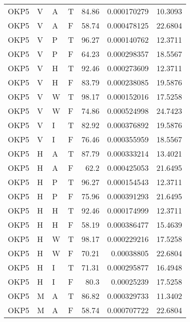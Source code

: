 \begin{longtable}{llllrrr}
    OKP5     & V     & A     & T          & 84.86      & 0.000170279 & 10.3093  \\
    OKP5     & V     & A     & F          & 58.74      & 0.000478125 & 22.6804  \\
    OKP5     & V     & P     & T          & 96.27      & 0.000140762 & 12.3711  \\
    OKP5     & V     & P     & F          & 64.23      & 0.000298357 & 18.5567  \\
    OKP5     & V     & H     & T          & 92.46      & 0.000273609 & 12.3711  \\
    OKP5     & V     & H     & F          & 83.79      & 0.000238085 & 19.5876  \\
    OKP5     & V     & W     & T          & 98.17      & 0.000152016 & 17.5258  \\
    OKP5     & V     & W     & F          & 74.86      & 0.000524998 & 24.7423  \\
    OKP5     & V     & I     & T          & 82.92      & 0.000376892 & 19.5876  \\
    OKP5     & V     & I     & F          & 76.46      & 0.000355959 & 18.5567  \\
    OKP5     & H     & A     & T          & 87.79      & 0.000333214 & 13.4021  \\
    OKP5     & H     & A     & F          & 62.2       & 0.000425053 & 21.6495  \\
    OKP5     & H     & P     & T          & 96.27      & 0.000154543 & 12.3711  \\
    OKP5     & H     & P     & F          & 75.96      & 0.000391293 & 21.6495  \\
    OKP5     & H     & H     & T          & 92.46      & 0.000174999 & 12.3711  \\
    OKP5     & H     & H     & F          & 58.19      & 0.000386477 & 15.4639  \\
    OKP5     & H     & W     & T          & 98.17      & 0.000229216 & 17.5258  \\
    OKP5     & H     & W     & F          & 70.21      & 0.00038805  & 22.6804  \\
    OKP5     & H     & I     & T          & 71.31      & 0.000295877 & 16.4948  \\
    OKP5     & H     & I     & F          & 80.3       & 0.00025239  & 17.5258  \\
    OKP5     & M     & A     & T          & 86.82      & 0.000329733 & 11.3402  \\
    OKP5     & M     & A     & F          & 58.74      & 0.000707722 & 22.6804  \\

\end{longtable}
